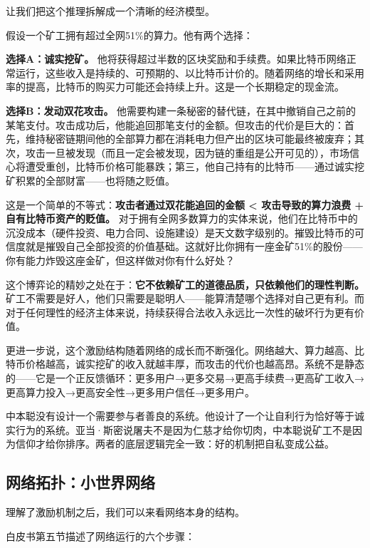 \documentclass[a4paper,12pt,openany]{ctexbook}
\begin{document}
让我们把这个推理拆解成一个清晰的经济模型。

假设一个矿工拥有超过全网51\%的算力。他有两个选择：

\textbf{选择A：诚实挖矿。} 他将获得超过半数的区块奖励和手续费。如果比特币网络正常运行，这些收入是持续的、可预期的、以比特币计价的。随着网络的增长和采用率的提高，比特币的购买力可能还会持续上升。这是一个长期稳定的现金流。

\textbf{选择B：发动双花攻击。} 他需要构建一条秘密的替代链，在其中撤销自己之前的某笔支付。攻击成功后，他能追回那笔支付的金额。但攻击的代价是巨大的：首先，维持秘密链期间他的全部算力都在消耗电力但产出的区块可能最终被废弃；其次，攻击一旦被发现（而且一定会被发现，因为链的重组是公开可见的），市场信心将遭受重创，比特币价格可能暴跌；第三，他自己持有的比特币——通过诚实挖矿积累的全部财富——也将随之贬值。

这是一个简单的不等式：\textbf{攻击者通过双花能追回的金额 < 攻击导致的算力浪费 + 自有比特币资产的贬值。} 对于拥有全网多数算力的实体来说，他们在比特币中的沉没成本（硬件投资、电力合同、设施建设）是天文数字级别的。摧毁比特币的可信度就是摧毁自己全部投资的价值基础。这就好比你拥有一座金矿51\%的股份——你有能力炸毁这座金矿，但这样做对你有什么好处？

这个博弈论的精妙之处在于：\textbf{它不依赖矿工的道德品质，只依赖他们的理性判断。} 矿工不需要是好人，他们只需要是聪明人——能算清楚哪个选择对自己更有利。而对于任何理性的经济主体来说，持续获得合法收入永远比一次性的破坏行为更有价值。

更进一步说，这个激励结构随着网络的成长而不断强化。网络越大、算力越高、比特币价格越高，诚实挖矿的收入就越丰厚，而攻击的代价也越高昂。系统不是静态的——它是一个正反馈循环：更多用户→更多交易→更高手续费→更高矿工收入→更高算力投入→更高安全性→更多用户信任→更多用户。

中本聪没有设计一个需要参与者善良的系统。他设计了一个让自利行为恰好等于诚实行为的系统。亚当·斯密说屠夫不是因为仁慈才给你切肉，中本聪说矿工不是因为信仰才给你排序。两者的底层逻辑完全一致：好的机制把自私变成公益。


\subsection*{网络拓扑：小世界网络}


理解了激励机制之后，我们可以来看网络本身的结构。

白皮书第五节描述了网络运行的六个步骤：
\end{document}
